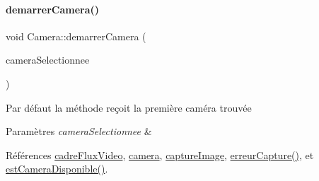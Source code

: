 \paragraph{\texorpdfstring{demarrer\+Camera()}{demarrerCamera()}\hspace{0.1cm}{\footnotesize\ttfamily [2/2]}}
{\footnotesize\ttfamily void Camera\+::demarrer\+Camera (\begin{DoxyParamCaption}\item[{Q\+Camera\+Info}]{camera\+Selectionnee }\end{DoxyParamCaption})\hspace{0.3cm}{\ttfamily [private]}}

Par défaut la méthode reçoit la première caméra trouvée 
\begin{DoxyParams}{Paramètres}
{\em camera\+Selectionnee} & \\
\hline
\end{DoxyParams}


Références \hyperlink{class_camera_abf5fd38d19f0f06dfd7ec9e37f73adb8}{cadre\+Flux\+Video}, \hyperlink{class_camera_a282a199ddd33fe64bc27b32a55719054}{camera}, \hyperlink{class_camera_a482276c4fd0ba7172670006556322b62}{capture\+Image}, \hyperlink{class_camera_ac5b8c16f8edcb92569fab87185fc0500}{erreur\+Capture()}, et \hyperlink{class_camera_afb73ab859802a143a1a00443e396143e}{est\+Camera\+Disponible()}.


